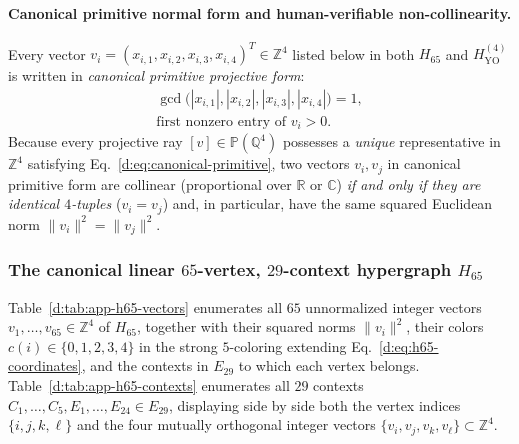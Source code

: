\documentclass[aps,pra,reprint,superscriptaddress,longbibliography,nofootinbib,floatfix,10pt]{revtex4-2}
\theoremstyle{definition}
\newcommand{\R}{\mathbb{R}}
\newcommand{\C}{\mathbb{C}}
\newcommand{\Q}{\mathbb{Q}}
\newcommand{\PP}{\mathbb{P}}
\newcommand{\YO}{\mathrm{YO}}
\begin{document}
\paragraph*{Canonical primitive normal form and human-verifiable non-collinearity.}
Every vector $v_i=(x_{i,1},x_{i,2},x_{i,3},x_{i,4})^T\in\mathbb{Z}^4$ listed below in both $H_{65}$ and $H_{\YO}^{(4)}$ is written in \emph{canonical primitive projective form}:
\begin{equation}\label{d:eq:canonical-primitive}
\begin{gathered}
\gcd\bigl(|x_{i,1}|,|x_{i,2}|,|x_{i,3}|,|x_{i,4}|\bigr)=1,\\
\text{first nonzero entry of }v_i > 0.
\end{gathered}
\end{equation}
Because every projective ray $[v]\in\PP(\Q^4)$ possesses a \emph{unique} representative in $\mathbb{Z}^4$ satisfying Eq.~\eqref{d:eq:canonical-primitive}, two vectors $v_i,v_j$ in canonical primitive form are collinear (proportional over $\R$ or $\C$) \emph{if and only if they are identical $4$-tuples} ($v_i=v_j$) and, in particular, have the same squared Euclidean norm $\|v_i\|^2=\|v_j\|^2$.

\subsubsection{The canonical linear \texorpdfstring{$65$}{65}-vertex, \texorpdfstring{$29$}{29}-context hypergraph \texorpdfstring{$H_{65}$}{H\_65}}\label{d:app:h65}

Table~\ref{d:tab:app-h65-vectors} enumerates all $65$ unnormalized integer vectors $v_1,\ldots,v_{65}\in\mathbb{Z}^4$ of $H_{65}$, together with their squared norms $\|v_i\|^2$, their colors $c(i)\in\{0,1,2,3,4\}$ in the strong $5$-coloring extending Eq.~\eqref{d:eq:h65-coordinates}, and the contexts in $E_{29}$ to which each vertex belongs. Table~\ref{d:tab:app-h65-contexts} enumerates all $29$ contexts $C_1,\ldots,C_5,E_1,\ldots,E_{24}\in E_{29}$, displaying side by side both the vertex indices $\{i,j,k,\ell\}$ and the four mutually orthogonal integer vectors $\{v_i,v_j,v_k,v_\ell\}\subset\mathbb{Z}^4$.
\end{document}
